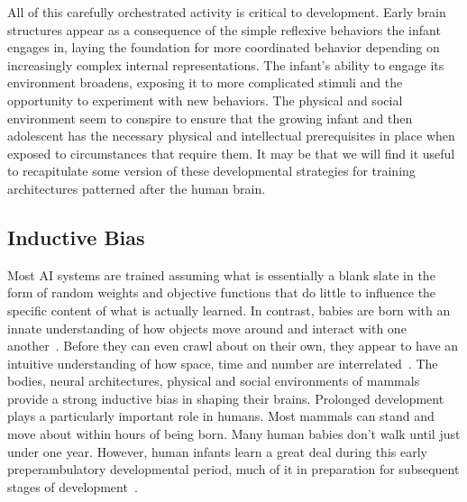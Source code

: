\documentclass[letterpaper,11pt]{article}
\def\footnote#1{{}}
\def\etal{{\em{et al}}}
\begin{document}
All of this carefully orchestrated activity is critical to development. Early brain structures appear as a consequence of the simple reflexive behaviors the infant engages in, laying the foundation for more coordinated behavior depending on increasingly complex internal representations. The infant's ability to engage its environment broadens, exposing it to more complicated stimuli and the opportunity to experiment with new behaviors. The physical and social environment seem to conspire to ensure that the growing infant and then adolescent has the necessary physical and intellectual prerequisites in place when exposed to circumstances that require them. It may be that we will find it useful to recapitulate some version of these developmental strategies for training architectures patterned after the human brain.


\subsection{Inductive Bias}


Most AI systems are trained assuming what is essentially a blank slate in the form of random weights and objective functions that do little to influence the specific content of what is actually learned\footnote{%
%
  There are exceptions. For example, Ullman~\etal~\cite{UllmanetalPNAS-12} suggest a collection of innate biases that enable the infant visual system to learn to detect human hands by appearance and by context, as well as direction of gaze, in complex natural scenes; Raposo~\etal~\cite{RaposoetalCSC-17} develop models that learn the relational structure of objects and their various arrangements; and Battaglia~\etal~\cite{BattagliaetalCoRR-18} explore the idea of how introducing a relational inductive bias can expedite learning about entities, relations and the rules for their composition.}.
%
In contrast, babies are born with an innate understanding of how objects move around and interact with one another~\cite{Dehaene-LambertzandSpelkeNEURON-15}. Before they can even crawl about on their own, they appear to have an intuitive understanding of how space, time and number are interrelated~\cite{deHeviaetalPNAS-14,HauserandSpelkeTCN-04}. 
%
The bodies, neural architectures, physical and social environments of mammals provide a strong inductive bias in shaping their brains. Prolonged development plays a particularly important role in humans. Most mammals can stand and move about within hours of being born. Many human babies don't walk until just under one year. However, human infants learn a great deal during this early preperambulatory developmental period, much of it in preparation for subsequent stages of development~\cite{MacLeanPNAS-16,RosatietalEVOLUTIONARY-PSYCHOLOGY-14}.
\end{document}
